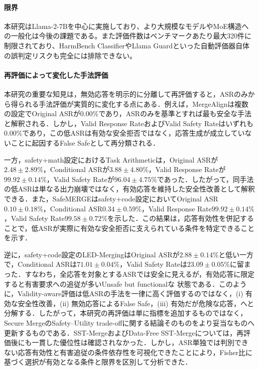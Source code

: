 \documentclass{article}
\begin{document}
\paragraph{限界}
本研究はLlama-2-7Bを中心に実施しており、より大規模なモデルやMoE構造への一般化は今後の課題である。また評価件数はベンチマークあたり最大320件に制限されており、HarmBench ClassifierやLlama Guardといった自動評価器自体の誤判定リスクも完全には排除できない。
\paragraph{再評価によって変化した手法評価}
本研究の重要な知見は，無効応答を明示的に分離して再評価すると，ASRのみから得られる手法評価が実質的に変化する点にある．例えば，MergeAlignは複数の設定でOriginal ASRが$0.00\%$であり，ASRのみを基準とすれば最も安全な手法と解釈される．しかし，Valid Response RateおよびValid Safety Rateはいずれも$0.00\%$であり，この低ASRは有効な安全拒否ではなく，応答生成が成立していないことに起因するFalse Safeとして再分類される．

一方，safety+math設定におけるTask Arithmeticは，Original ASRが$2.48 \pm 2.89\%$，Conditional ASRが$3.88 \pm 4.80\%$，Valid Response Rateが$99.92 \pm 0.14\%$，Valid Safety Rateが$96.04 \pm 4.75\%$であった．したがって，同手法の低ASRは単なる出力崩壊ではなく，有効応答を維持した安全性改善として解釈できる．また，SafeMERGEはsafety+code設定においてOriginal ASR$0.10 \pm 0.18\%$，Conditional ASR$0.34 \pm 0.59\%$，Valid Response Rate$99.92 \pm 0.14\%$，Valid Safety Rate$99.58 \pm 0.72\%$を示した．この結果は，応答有効性を併記することで，低ASRが実際に有効な安全拒否に支えられている条件を特定できることを示す．

逆に，safety+code設定のLED-MergingはOriginal ASRが$2.88 \pm 0.14\%$と低い一方で，Conditional ASRは$71.01 \pm 0.04\%$，Valid Safety Rateは$23.09 \pm 0.05\%$に留まった．すなわち，全応答を対象とするASRでは安全に見えるが，有効応答に限定すると有害要求への追従が多いUnsafe but functionalな
状態である．このように，Validity-aware評価は低ASRの手法を一律に高く評価するのではなく，(i) 有効な安全性改善，(ii) 無効応答によるFalse Safe，(iii) 有効だが危険な応答，へと分解する．したがって，本研究の再評価は単に指標を追加するものではなく，Secure MergeのSafety--Utility trade-offに関する結論そのものをより妥当なものへ更新するものである．SST-MergeおよびData-Free SST-Mergeについては，再評価後にも一貫した優位性は確認されなかった．しかし，ASR単独では判別できない応答有効性と有害追従の条件依存性を可視化できたことにより，Fisher比に基づく選択が有効となる条件と限界を区別して分析できた．
\end{document}

